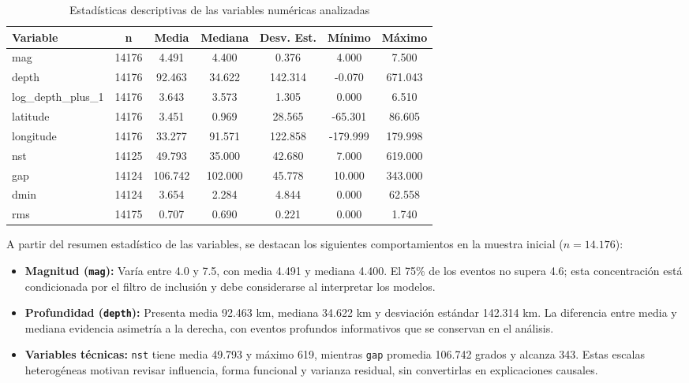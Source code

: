 \documentclass{style}
\newcommand{\var}[1]{\texttt{#1}}
\begin{document}
\begin{table}[H]
    \centering
    \caption{Estadísticas descriptivas de las variables numéricas analizadas}
    \label{tab:estadisticas_descriptivas}
    \scriptsize
    \setlength{\tabcolsep}{12pt} 
    \begin{tabular}{lcccccc}
    \toprule
    \textbf{Variable} & \textbf{n} & \textbf{Media} & \textbf{Mediana} & \textbf{Desv. Est.} & \textbf{Mínimo} & \textbf{Máximo} \\
    \midrule
    mag & 14176 & 4.491 & 4.400 & 0.376 & 4.000 & 7.500 \\
    depth & 14176 & 92.463 & 34.622 & 142.314 & -0.070 & 671.043 \\
    log\_depth\_plus\_1 & 14176 & 3.643 & 3.573 & 1.305 & 0.000 & 6.510 \\
    latitude & 14176 & 3.451 & 0.969 & 28.565 & -65.301 & 86.605 \\
    longitude & 14176 & 33.277 & 91.571 & 122.858 & -179.999 & 179.998 \\
    nst & 14125 & 49.793 & 35.000 & 42.680 & 7.000 & 619.000 \\
    gap & 14124 & 106.742 & 102.000 & 45.778 & 10.000 & 343.000 \\
    dmin & 14124 & 3.654 & 2.284 & 4.844 & 0.000 & 62.558 \\
    rms & 14175 & 0.707 & 0.690 & 0.221 & 0.000 & 1.740 \\
    \bottomrule
    \end{tabular}
\end{table}

A partir del resumen estadístico de las variables, se destacan los siguientes comportamientos en la muestra inicial ($n = 14.176$):

\begin{itemize}
    \item \textbf{Magnitud (\var{mag}):} Varía entre 4.0 y 7.5, con media 4.491 y mediana 4.400. El 75\% de los eventos no supera 4.6; esta concentración está condicionada por el filtro de inclusión y debe considerarse al interpretar los modelos.

    
    \item \textbf{Profundidad (\var{depth}):} Presenta media 92.463 km, mediana 34.622 km y desviación estándar 142.314 km. La diferencia entre media y mediana evidencia asimetría a la derecha, con eventos profundos informativos que se conservan en el análisis.

    \item \textbf{Variables técnicas:} \var{nst} tiene media 49.793 y máximo 619, mientras \var{gap} promedia 106.742 grados y alcanza 343. Estas escalas heterogéneas motivan revisar influencia, forma funcional y varianza residual, sin convertirlas en explicaciones causales.

\end{itemize}
\end{document}
